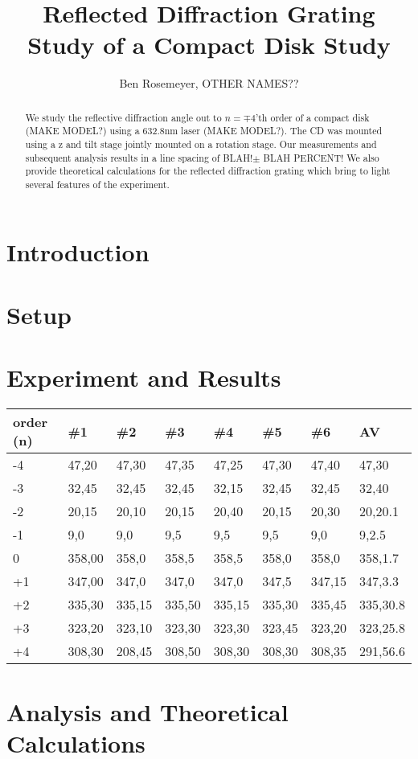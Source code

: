 \documentclass[a4paper,11pt]{article}
\title{Reflected Diffraction Grating Study of a Compact Disk Study}
\author{Ben Rosemeyer, OTHER NAMES??}
\begin{document}
\maketitle
\tableofcontents

\begin{abstract}
We study the reflective diffraction angle out to $n=\mp 4$'th order of a compact disk (MAKE MODEL?) using a 632.8nm laser (MAKE MODEL?). The CD was mounted using a z and tilt stage jointly mounted on a rotation stage. Our measurements and subsequent analysis results in a line spacing of BLAH!$\pm$ BLAH PERCENT! We also provide theoretical calculations for the reflected diffraction grating which bring to light several features of the experiment.
\end{abstract}

\section{Introduction}

\section{Setup}

\section{Experiment and Results}

  \begin{tabular}{| l || l | l | l | l | l | l | l|}
    \hline
    order (n) & \#1 & \#2 & \#3 & \#4 & \#5 & \#6 & AV \\ \hline
    -4 & 47,20 & 47,30 & 47,35 & 47,25 & 47,30 & 47,40 & 47,30 \\ \hline
    -3 & 32,45 & 32,45 & 32,45 & 32,15 & 32,45 & 32,45 & 32,40 \\ \hline
    -2 & 20,15 & 20,10 & 20,15 & 20,40 & 20,15 & 20,30 & 20,20.1 \\ \hline
    -1 &   9,0 &   9,0 & 9,5 & 9,5 & 9,5 & 9,0 & 9,2.5 \\ \hline
     0 & 358,00 & 358,0 & 358,5 & 358,5 & 358,0 & 358,0 & 358,1.7 \\ \hline
    +1 & 347,00 & 347,0 & 347,0 & 347,0 & 347,5 & 347,15 & 347,3.3 \\ \hline
    +2 & 335,30 & 335,15 & 335,50 & 335,15 & 335,30 & 335,45 & 335,30.8\\ \hline
    +3 & 323,20 & 323,10 & 323,30 & 323,30 & 323,45 & 323,20 & 323,25.8 \\ \hline
    +4 & 308,30 & 208,45 & 308,50 & 308,30 & 308,30 & 308,35 & 291,56.6 \\
    \hline
  \end{tabular}
\section{Analysis and Theoretical Calculations}
\end{document}
